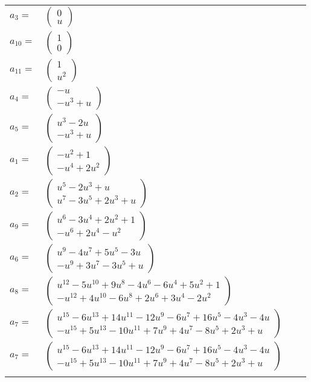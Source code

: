 \documentclass[1p]{elsarticle_modified}
\theoremstyle{definition}
\begin{document}
\begin{tabular}{m{7pt} m{180pt} m{7pt} m{180pt} }
\flushright $a_{3}=$&$\begin{pmatrix}0\\u\end{pmatrix}$ \\
\flushright $a_{10}=$&$\begin{pmatrix}1\\0\end{pmatrix}$ \\
\flushright $a_{11}=$&$\begin{pmatrix}1\\u^2\end{pmatrix}$ \\
\flushright $a_{4}=$&$\begin{pmatrix}- u\\- u^3+u\end{pmatrix}$ \\
\flushright $a_{5}=$&$\begin{pmatrix}u^3-2 u\\- u^3+u\end{pmatrix}$ \\
\flushright $a_{1}=$&$\begin{pmatrix}- u^2+1\\- u^4+2 u^2\end{pmatrix}$ \\
\flushright $a_{2}=$&$\begin{pmatrix}u^5-2 u^3+u\\u^7-3 u^5+2 u^3+u\end{pmatrix}$ \\
\flushright $a_{9}=$&$\begin{pmatrix}u^6-3 u^4+2 u^2+1\\- u^6+2 u^4- u^2\end{pmatrix}$ \\
\flushright $a_{6}=$&$\begin{pmatrix}u^9-4 u^7+5 u^5-3 u\\- u^9+3 u^7-3 u^5+u\end{pmatrix}$ \\
\flushright $a_{8}=$&$\begin{pmatrix}u^{12}-5 u^{10}+9 u^8-4 u^6-6 u^4+5 u^2+1\\- u^{12}+4 u^{10}-6 u^8+2 u^6+3 u^4-2 u^2\end{pmatrix}$ \\
\flushright $a_{7}=$&$\begin{pmatrix}u^{15}-6 u^{13}+14 u^{11}-12 u^9-6 u^7+16 u^5-4 u^3-4 u\\- u^{15}+5 u^{13}-10 u^{11}+7 u^9+4 u^7-8 u^5+2 u^3+u\end{pmatrix}$\\ \flushright $a_{7}=$&$\begin{pmatrix}u^{15}-6 u^{13}+14 u^{11}-12 u^9-6 u^7+16 u^5-4 u^3-4 u\\- u^{15}+5 u^{13}-10 u^{11}+7 u^9+4 u^7-8 u^5+2 u^3+u\end{pmatrix}$\\&\end{tabular}
\end{document}
